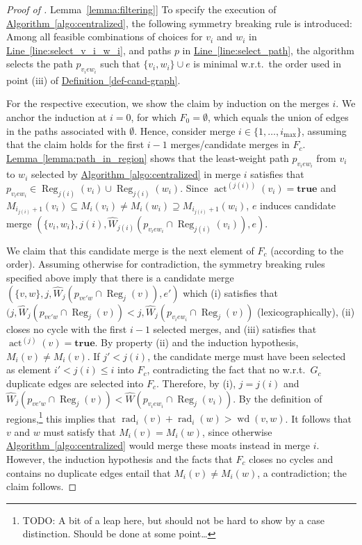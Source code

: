 \documentclass[letterpaper,11pt]{article}
\newcommand{\namedref}[2]{\hyperref[#2]{#1~\ref*{#2}}}
\newcommand{\defref}[1]{\namedref{Definition}{#1}}
\newcommand{\lemmaref}[1]{\namedref{Lemma}{#1}}
\newcommand{\algref}[1]{\namedref{Algorithm}{#1}}
\newcommand{\lineref}[1]{\namedref{Line}{#1}}
\DeclareMathOperator{\act}{act}
\DeclareMathOperator{\moat}{rad}
\DeclareMathOperator{\Wd}{wd}
\DeclareMathOperator{\reg}{Reg}
\newcommand{\true}{\mathbf{true}}
\begin{document}
\begin{proof}[Proof of \lemmaref{lemma:filtering}]
To specify the execution of \algref{algo:centralized}, the following symmetry
breaking rule is introduced: Among all feasible combinations of choices for
$v_i$ and $w_i$ in \lineref{line:select_v_i_w_i}, and paths $p$ in
\lineref{line:select_path}, the algorithm selects the path $p_{v_iew_i}$ such
that $\{v_i,w_i\}\cup e$ is minimal w.r.t.\ the order used in point (iii) of
\defref{def-cand-graph}.

For the respective execution, we show the claim by induction on the merges $i$.
We anchor the induction at $i=0$, for which $F_0=\emptyset$, which equals the
union of edges in the paths associated with $\emptyset$. Hence, consider merge
$i\in \{1,\ldots,i_{\max}\}$, assuming that the claim holds for the first $i-1$
merges/candidate merges in $F_c$. \lemmaref{lemma:path_in_region} shows that the
least-weight path $p_{v_iew_i}$ from $v_i$ to $w_i$ selected by
\algref{algo:centralized} in merge $i$ satisfies that $p_{v_iew_i}\in
\reg_{j(i)}(v_i)\cup \reg_{j(i)}(w_i)$. Since $\act^{(j(i))}(v_i)=\true$ and
$M_{i_{j(i)}+1}(v_i)\subseteq M_i(v_i)\neq M_i(w_i)\supseteq
M_{i_{j(i)}+1}(w_i)$, $e$ induces candidate merge
$(\{v_i,w_i\},j(i),\hat{W}_{j(i)}(p_{v_iew_i}\cap \reg_{j(i)}(v_i)),e)$.

We claim that this candidate merge is the next element of $F_c$ (according to
the order). Assuming otherwise for contradiction, the symmetry breaking rules
specified above imply that there is a candidate merge
$(\{v,w\},j,\hat{W}_j(p_{ve'w}\cap \reg_j(v)),e')$ which (i) satisfies that
$(j,\hat{W}_j(p_{ve'w}\cap \reg_j(v))<j,\hat{W}_j(p_{v_iew_i}\cap \reg_j(v))$
(lexicographically), (ii) closes no cycle with the first $i-1$ selected merges,
and (iii) satisfies that $\act^{(j)}(v)=\true$. By property (ii) and the
induction hypothesis, $M_i(v)\neq M_i(v)$. If $j'<j(i)$, the candidate merge
must have been selected as element $i'<j(i)\leq i$ into $F_c$, contradicting the
fact that no w.r.t.\ $G_c$ duplicate edges are selected into $F_c$. Therefore,
by (i), $j=j(i)$ and $\hat{W}_j(p_{ve'w}\cap \reg_j(v))<\hat{W}(p_{v_iew_i}\cap
\reg_j(v_i))$. By the definition of regions,\footnote{TODO: A bit of a leap
here, but should not be hard to show by a case distinction. Should be done at
some point\ldots} this implies that $\moat_i(v)+\moat_i(w)>\Wd(v,w)$.
It follows that $v$ and $w$ must satisfy that $M_i(v)=M_i(w)$, since otherwise
\algref{algo:centralized} would merge these moats instead in merge $i$. However,
the induction hypothesis and the facts that $F_c$ closes no cycles and contains
no duplicate edges entail that $M_i(v)\neq M_i(w)$, a contradiction; the claim
follows.


\end{proof}
\end{document}
